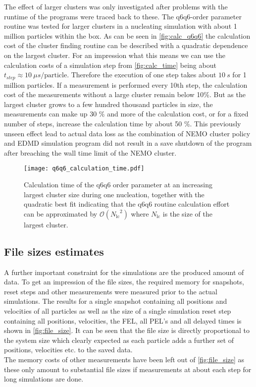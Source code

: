 The effect of larger clusters was only investigated after problems with the runtime of the programs were traced back to these. The q6q6-order parameter routine was tested for larger clusters in a nucleating simulation with about 1 million particles within the box. As can be seen in \autoref{fig:calc_q6q6} the calculation cost of the cluster finding routine can be described with a quadratic dependence on the largest cluster. For an impression what this means we can use the calculation costs of a simulation step from \autoref{fig:calc_time} being about $t_{step} \approx \SI{10}{\mu s \per \text{particle} }$. Therefore the execution of one step takes about $\SI{10}{s}$ for 1 million particles. If a measurement is performed every 10th step, the calculation cost of the measurements without a large cluster remain below 10\%. But as the largest cluster grows to a few hundred thousand particles in size, the measurements can make up 30 \% and more of the calculation cost, or for a fixed number of steps, increase the calculation time by about 50 \%. This previously unseen effect lead to actual data loss as the combination of NEMO cluster policy and EDMD simulation program did not result in a save shutdown of the program after breaching the wall time limit of the NEMO cluster.\\

\begin{figure}[h!]
\centering
\texttt{[image: q6q6\_calculation\_time.pdf]}
\caption[Quadratic calculation time of q6q6-order parameter cluster finding routine]{Calculation time of the q6q6 order parameter at an increasing largest cluster size during one nucleation, together with the quadratic best fit indicating that the q6q6 routine calculation effort can be approximated by $\mathcal{O}({N_{\text{lc}}}^2)$ where $N_{\text{lc}}$ is the size of the largest cluster.}
\label{fig:calc_q6q6}
\end{figure}


\subsection{File sizes estimates}
\label{sec:file_size}
A further important constraint for the simulations are the produced amount of data. To get an impression of the file sizes, the required memory for snapshots, reset steps and other measurements were measured prior to the actual simulations. The results for a single snapshot containing all positions and velocities of all particles as well as the size of a single simulation reset step containing all positions, velocities, the FEL, all PEL's and all delayed times is shown in \autoref{fig:file_size}. It can be seen that the file size is directly proportional to the system size which clearly expected as each particle adds a further set of positions, velocities etc. to the saved data.\\
The memory costs of other measurements have been left out of \autoref{fig:file_size} as these only amount to substantial file sizes if measurements at about each step for long simulations are done.\\  

